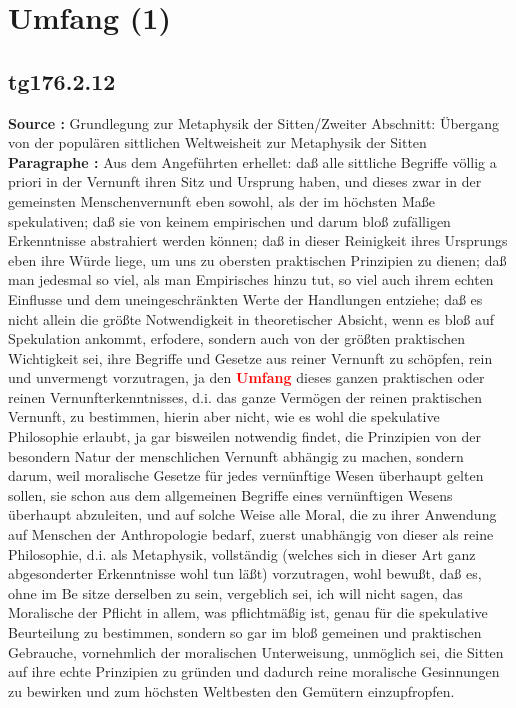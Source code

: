 \documentclass[a4paper,12pt,twoside]{book}
\newcommand{\match}[1]{\textcolor{red}{\textbf{#1}}}
\newcommand{\unnumberedsection}[1]{
	\section*{#1}
	\addcontentsline{toc}{section}{#1}
	\markright{#1}
}
\begin{document}
	\unnumberedsection{Umfang (1)} 
	\subsection*{tg176.2.12} 
	\textbf{Source : }Grundlegung zur Metaphysik der Sitten/Zweiter Abschnitt: Übergang von der populären sittlichen Weltweisheit zur Metaphysik der Sitten\\  
	
	\textbf{Paragraphe : }Aus dem Angeführten erhellet: daß alle sittliche Begriffe völlig a priori in der Vernunft ihren Sitz und Ursprung haben, und dieses zwar in der gemeinsten Menschenvernunft eben sowohl, als der im höchsten Maße spekulativen; daß sie von keinem empirischen und darum bloß zufälligen Erkenntnisse  abstrahiert werden können; daß in dieser Reinigkeit ihres Ursprungs eben ihre Würde liege, um uns zu obersten praktischen Prinzipien zu dienen; daß man jedesmal so viel, als man Empirisches hinzu tut, so viel auch ihrem echten Einflusse und dem uneingeschränkten Werte der Handlungen entziehe; daß es nicht allein die größte Notwendigkeit in theoretischer Absicht, wenn es bloß auf Spekulation ankommt, erfodere, sondern auch von der größten praktischen Wichtigkeit sei, ihre Begriffe und Gesetze aus reiner Vernunft zu schöpfen, rein und unvermengt vorzutragen, ja den \match{Umfang} dieses ganzen praktischen oder reinen Vernunfterkenntnisses, d.i. das ganze Vermögen der reinen praktischen Vernunft, zu bestimmen, hierin aber nicht, wie es wohl die spekulative Philosophie erlaubt, ja gar bisweilen notwendig findet, die Prinzipien von der besondern Natur der menschlichen Vernunft abhängig zu machen, sondern darum, weil moralische Gesetze für jedes vernünftige Wesen überhaupt gelten sollen, sie schon aus dem allgemeinen Begriffe eines vernünftigen Wesens überhaupt abzuleiten, und auf solche Weise alle Moral, die zu ihrer Anwendung auf Menschen der Anthropologie bedarf, zuerst unabhängig von dieser als reine Philosophie, d.i. als Metaphysik, vollständig (welches sich in dieser Art ganz abgesonderter Erkenntnisse wohl tun läßt) vorzutragen, wohl bewußt, daß es, ohne im Be sitze derselben zu sein, vergeblich sei, ich will nicht sagen, das Moralische der Pflicht in allem, was pflichtmäßig ist, genau für die spekulative Beurteilung zu bestimmen, sondern so gar im bloß gemeinen und praktischen Gebrauche, vornehmlich der moralischen Unterweisung, unmöglich sei, die Sitten auf ihre echte Prinzipien zu gründen und dadurch reine moralische Gesinnungen zu bewirken und zum höchsten Weltbesten den Gemütern einzupfropfen. 
	
\end{document}
